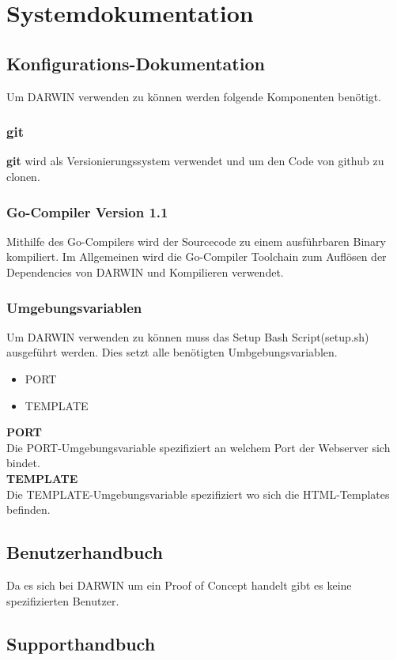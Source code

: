 \section{Systemdokumentation}
\subsection{Konfigurations-Dokumentation}
Um DARWIN verwenden zu können werden folgende Komponenten benötigt.
\subsubsection{git}
\textbf{git} wird als Versionierungssystem verwendet und um den 
Code von github zu clonen. 
\subsubsection{Go-Compiler Version 1.1}
Mithilfe des Go-Compilers wird der Sourcecode zu einem ausführbaren Binary
kompiliert. Im Allgemeinen wird die Go-Compiler Toolchain zum Auflösen 
der Dependencies von DARWIN und Kompilieren verwendet.
\subsubsection{Umgebungsvariablen}
Um DARWIN verwenden zu können muss das Setup Bash Script(setup.sh) ausgeführt werden.
Dies setzt alle benötigten Umbgebungsvariablen.
\begin{itemize}
    \item PORT
    \item TEMPLATE
\end{itemize}
\textbf{PORT}
\\
Die PORT-Umgebungsvariable spezifiziert an welchem  Port der Webserver sich
bindet.
\\
\textbf{TEMPLATE}
\\
Die TEMPLATE-Umgebungsvariable spezifiziert wo sich die HTML-Templates befinden. 
\subsection{Benutzerhandbuch}
Da es sich bei DARWIN um ein Proof of Concept handelt gibt es 
keine spezifizierten Benutzer.\\
\subsection{Supporthandbuch}
